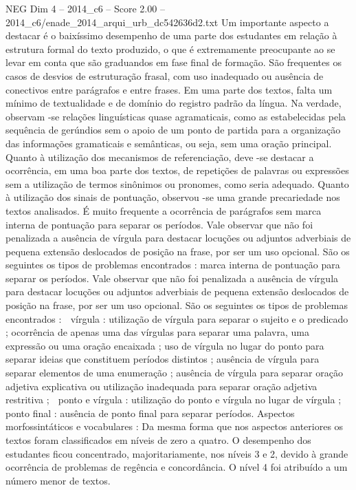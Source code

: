 \begin{textsample}{NEG Dim 4 – 2014\_c6 – Score 2.00 – 2014\_c6/enade\_2014\_arqui\_urb\_dc542636d2.txt}
Um importante aspecto a destacar é o baixíssimo desempenho de uma parte dos estudantes em relação à estrutura formal do texto produzido, o que é extremamente preocupante ao se levar em conta que são graduandos em fase final de formação.
São frequentes os casos de desvios de estruturação frasal, com uso inadequado ou ausência de conectivos entre parágrafos e entre frases.
Em uma parte dos textos, falta um mínimo de textualidade e de domínio do registro padrão da língua.
Na verdade, observam -se relações linguísticas quase agramaticais, como as estabelecidas pela sequência de gerúndios sem o apoio de um ponto de partida para a organização das informações gramaticais e semânticas, ou seja, sem uma oração principal.
Quanto à utilização dos mecanismos de referenciação, deve -se destacar a ocorrência, em uma boa parte dos textos, de repetições de palavras ou expressões sem a utilização de termos sinônimos ou pronomes, como seria adequado.
Quanto à utilização dos sinais de pontuação, observou -se uma grande precariedade nos textos analisados.
É muito frequente a ocorrência de parágrafos sem marca interna de pontuação para separar os períodos.
Vale observar que não foi penalizada a ausência de vírgula para destacar locuções ou adjuntos adverbiais de pequena extensão deslocados de posição na frase, por ser um uso opcional.
São os seguintes os tipos de problemas encontrados : marca interna de pontuação para separar os períodos.
Vale observar que não foi penalizada a ausência de vírgula para destacar locuções ou adjuntos adverbiais de pequena extensão deslocados de posição na frase, por ser um uso opcional.
São os seguintes os tipos de problemas encontrados :  vírgula : utilização de vírgula para separar o sujeito e o predicado ; ocorrência de apenas uma das vírgulas para separar uma palavra, uma expressão ou uma oração encaixada ; uso de vírgula no lugar do ponto para separar ideias que constituem períodos distintos ; ausência de vírgula para separar elementos de uma enumeração ; ausência de vírgula para separar oração adjetiva explicativa ou utilização inadequada para separar oração adjetiva restritiva ;  ponto e vírgula : utilização do ponto e vírgula no lugar de vírgula ;  ponto final : ausência de ponto final para separar períodos.
Aspectos morfossintáticos e vocabulares : Da mesma forma que nos aspectos anteriores os textos foram classificados em níveis de zero a quatro.
O desempenho dos estudantes ficou concentrado, majoritariamente, nos níveis 3 e 2, devido à grande ocorrência de problemas de regência e concordância.
O nível 4 foi atribuído a um número menor de textos.

\end{textsample}

